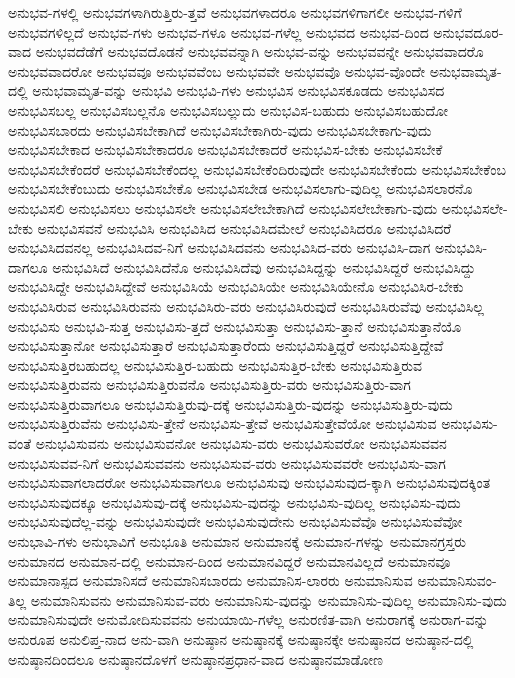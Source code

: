 {ಅನುಭವ-ಗಳಲ್ಲಿ
ಅನುಭವಗಳಾಗಿರುತ್ತಿರು-ತ್ತವೆ
ಅನುಭವಗಳಾದರೂ
ಅನುಭವಗಳಿಗಾಗಲೀ
ಅನುಭವ-ಗಳಿಗೆ
ಅನುಭವಗಳಿಲ್ಲದೆ
ಅನುಭವ-ಗಳು
ಅನುಭವ-ಗಳೂ
ಅನುಭವ-ಗಳೆಲ್ಲ
ಅನುಭವದ
ಅನುಭವ-ದಿಂದ
ಅನುಭವದೂರ-ವಾದ
ಅನುಭವದೆಡೆಗೆ
ಅನುಭವದೊಡನೆ
ಅನುಭವವನ್ನಾಗಿ
ಅನುಭವ-ವನ್ನು
ಅನುಭವವನ್ನೇ
ಅನುಭವವಾದರೊ
ಅನುಭವವಾದರೋ
ಅನುಭವವೂ
ಅನುಭವವೆಂಬ
ಅನುಭವವೇ
ಅನುಭವವೊ
ಅನುಭವ-ವೊಂದೇ
ಅನುಭವಾಮೃತ-ದಲ್ಲಿ
ಅನುಭವಾಮೃತ-ವನ್ನು
ಅನುಭವಿ
ಅನುಭವಿ-ಗಳು
ಅನುಭವಿಸ
ಅನುಭವಿಸಕೂಡದು
ಅನುಭವಿಸದ
ಅನುಭವಿಸಬಲ್ಲ
ಅನುಭವಿಸಬಲ್ಲನೊ
ಅನುಭವಿಸಬಲ್ಲುದು
ಅನುಭವಿಸ-ಬಹುದು
ಅನುಭವಿಸಬಹುದೋ
ಅನುಭವಿಸಬಾರದು
ಅನುಭವಿಸಬೇಕಾಗಿದೆ
ಅನುಭವಿಸಬೇಕಾಗಿರು-ವುದು
ಅನುಭವಿಸಬೇಕಾಗು-ವುದು
ಅನುಭವಿಸಬೇಕಾದ
ಅನುಭವಿಸಬೇಕಾದರೂ
ಅನುಭವಿಸಬೇಕಾದರೆ
ಅನುಭವಿಸ-ಬೇಕು
ಅನುಭವಿಸಬೇಕೆ
ಅನುಭವಿಸಬೇಕೆಂದರೆ
ಅನುಭವಿಸಬೇಕೆಂದಲ್ಲ
ಅನುಭವಿಸಬೇಕೆಂದಿರುವುದೇ
ಅನುಭವಿಸಬೇಕೆಂದು
ಅನುಭವಿಸಬೇಕೆಂಬ
ಅನುಭವಿಸಬೇಕೆಂಬುದು
ಅನುಭವಿಸಬೇಕೊ
ಅನುಭವಿಸಬೇಡ
ಅನುಭವಿಸಲಾಗು-ವುದಿಲ್ಲ
ಅನುಭವಿಸಲಾರನೊ
ಅನುಭವಿಸಲಿ
ಅನುಭವಿಸಲು
ಅನುಭವಿಸಲೇ
ಅನುಭವಿಸಲೇಬೇಕಾಗಿದೆ
ಅನುಭವಿಸಲೇಬೇಕಾಗು-ವುದು
ಅನುಭವಿಸಲೇ-ಬೇಕು
ಅನುಭವಿಸವನೆ
ಅನುಭವಿಸಿ
ಅನುಭವಿಸಿದ
ಅನುಭವಿಸಿದಮೇಲೆ
ಅನುಭವಿಸಿದರೂ
ಅನುಭವಿಸಿದರೆ
ಅನುಭವಿಸಿದವನಲ್ಲ
ಅನುಭವಿಸಿದವ-ನಿಗೆ
ಅನುಭವಿಸಿದವನು
ಅನುಭವಿಸಿದ-ವರು
ಅನುಭವಿಸಿ-ದಾಗ
ಅನುಭವಿಸಿ-ದಾಗಲೂ
ಅನುಭವಿಸಿದೆ
ಅನುಭವಿಸಿದೆನೊ
ಅನುಭವಿಸಿದೆವು
ಅನುಭವಿಸಿದ್ದನ್ನು
ಅನುಭವಿಸಿದ್ದರೆ
ಅನುಭವಿಸಿದ್ದು
ಅನುಭವಿಸಿದ್ದೇ
ಅನುಭವಿಸಿದ್ದೇವೆ
ಅನುಭವಿಸಿಯೆ
ಅನುಭವಿಸಿಯೇ
ಅನುಭವಿಸಿಯೇನೊ
ಅನುಭವಿಸಿರ-ಬೇಕು
ಅನುಭವಿಸಿರುವ
ಅನುಭವಿಸಿರುವನು
ಅನುಭವಿಸಿರು-ವರು
ಅನುಭವಿಸಿರುವುದೆ
ಅನುಭವಿಸಿರುವೆವು
ಅನುಭವಿಸಿಲ್ಲ
ಅನುಭವಿಸು
ಅನುಭವಿ-ಸುತ್ತ
ಅನುಭವಿಸು-ತ್ತದೆ
ಅನುಭವಿಸುತ್ತಾ
ಅನುಭವಿಸು-ತ್ತಾನೆ
ಅನುಭವಿಸುತ್ತಾನೆಯೊ
ಅನುಭವಿಸುತ್ತಾನೋ
ಅನುಭವಿಸುತ್ತಾರೆ
ಅನುಭವಿಸುತ್ತಾರೆಂದು
ಅನುಭವಿಸುತ್ತಿದ್ದರೆ
ಅನುಭವಿಸುತ್ತಿದ್ದೇವೆ
ಅನುಭವಿಸುತ್ತಿರಬಹುದಲ್ಲ
ಅನುಭವಿಸುತ್ತಿರ-ಬಹುದು
ಅನುಭವಿಸುತ್ತಿರ-ಬೇಕು
ಅನುಭವಿಸುತ್ತಿರುವ
ಅನುಭವಿಸುತ್ತಿರುವನು
ಅನುಭವಿಸುತ್ತಿರುವನೊ
ಅನುಭವಿಸುತ್ತಿರು-ವರು
ಅನುಭವಿಸುತ್ತಿರು-ವಾಗ
ಅನುಭವಿಸುತ್ತಿರುವಾಗಲೂ
ಅನುಭವಿಸುತ್ತಿರುವು-ದಕ್ಕೆ
ಅನುಭವಿಸುತ್ತಿರು-ವುದನ್ನು
ಅನುಭವಿಸುತ್ತಿರು-ವುದು
ಅನುಭವಿಸುತ್ತಿರುವೆನು
ಅನುಭವಿಸು-ತ್ತೇನೆ
ಅನುಭವಿಸು-ತ್ತೇವೆ
ಅನುಭವಿಸುತ್ತೇವೆಯೋ
ಅನುಭವಿಸುವ
ಅನುಭವಿಸು-ವಂತೆ
ಅನುಭವಿಸುವನು
ಅನುಭವಿಸುವನೋ
ಅನುಭವಿಸು-ವರು
ಅನುಭವಿಸುವರೋ
ಅನುಭವಿಸುವವನ
ಅನುಭವಿಸುವವ-ನಿಗೆ
ಅನುಭವಿಸುವವನು
ಅನುಭವಿಸುವ-ವರು
ಅನುಭವಿಸುವವರೇ
ಅನುಭವಿಸು-ವಾಗ
ಅನುಭವಿಸುವಾಗಲಾದರೋ
ಅನುಭವಿಸುವಾಗಲೂ
ಅನುಭವಿಸುವು
ಅನುಭವಿಸುವುದ-ಕ್ಕಾಗಿ
ಅನುಭವಿಸುವುದಕ್ಕಿಂತ
ಅನುಭವಿಸುವುದಕ್ಕೂ
ಅನುಭವಿಸುವು-ದಕ್ಕೆ
ಅನುಭವಿಸು-ವುದನ್ನು
ಅನುಭವಿಸು-ವುದಿಲ್ಲ
ಅನುಭವಿಸು-ವುದು
ಅನುಭವಿಸುವುದೆಲ್ಲ-ವನ್ನು
ಅನುಭವಿಸುವುದೇ
ಅನುಭವಿಸುವುದೇನು
ಅನುಭವಿಸುವೆವೊ
ಅನುಭವಿಸುವೆವೋ
ಅನುಭಾವಿ-ಗಳು
ಅನುಭಾವಿಗೆ
ಅನುಭೂತಿ
ಅನುಮಾನ
ಅನುಮಾನಕ್ಕೆ
ಅನುಮಾನ-ಗಳನ್ನು
ಅನುಮಾನಗ್ರಸ್ತರು
ಅನುಮಾನದ
ಅನುಮಾನ-ದಲ್ಲಿ
ಅನುಮಾನ-ದಿಂದ
ಅನುಮಾನವಿದ್ದರೆ
ಅನುಮಾನವಿಲ್ಲದೆ
ಅನುಮಾನವೂ
ಅನುಮಾನಾಸ್ಪದ
ಅನುಮಾನಿಸದೆ
ಅನುಮಾನಿಸಬಾರದು
ಅನುಮಾನಿಸ-ಲಾರರು
ಅನುಮಾನಿಸುವ
ಅನುಮಾನಿಸುವಂ-ತಿಲ್ಲ
ಅನುಮಾನಿಸುವನು
ಅನುಮಾನಿಸುವ-ವರು
ಅನುಮಾನಿಸು-ವುದನ್ನು
ಅನುಮಾನಿಸು-ವುದಿಲ್ಲ
ಅನುಮಾನಿಸು-ವುದು
ಅನುಮಾನಿಸುವುದೇ
ಅನುಮೋದಿಸುವವನು
ಅನುಯಾಯಿ-ಗಳೆಲ್ಲ
ಅನುರಣಿತ-ವಾಗಿ
ಅನುರಾಗಕ್ಕೆ
ಅನುರಾಗ-ವನ್ನು
ಅನುರೂಪ
ಅನುಲಿಪ್ತ-ನಾದ
ಅನು-ವಾಗಿ
ಅನುಷ್ಠಾನ
ಅನುಷ್ಠಾನಕ್ಕೆ
ಅನುಷ್ಠಾನಕ್ಕೇ
ಅನುಷ್ಠಾನದ
ಅನುಷ್ಠಾನ-ದಲ್ಲಿ
ಅನುಷ್ಠಾನದಿಂದಲೂ
ಅನುಷ್ಠಾನದೊಳಗೆ
ಅನುಷ್ಠಾನಪ್ರಧಾನ-ವಾದ
ಅನುಷ್ಠಾನಮಾಡೋಣ
}
